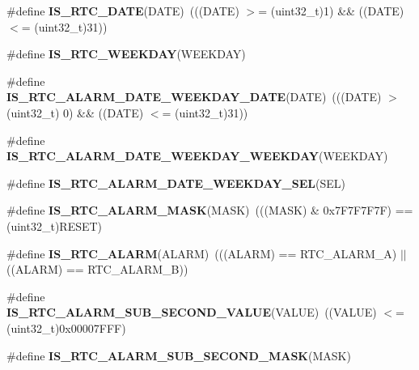 \begin{DoxyCompactItemize}
\item 
\#define {\bfseries I\+S\+\_\+\+R\+T\+C\+\_\+\+D\+A\+TE}(D\+A\+TE)~(((D\+A\+TE) $>$= (uint32\+\_\+t)1) \&\& ((D\+A\+TE) $<$= (uint32\+\_\+t)31))\hypertarget{group___r_t_c___i_s___r_t_c___definitions_ga3b6e966e144cb0495563ef0283d16510}{}\label{group___r_t_c___i_s___r_t_c___definitions_ga3b6e966e144cb0495563ef0283d16510}

\item 
\#define {\bfseries I\+S\+\_\+\+R\+T\+C\+\_\+\+W\+E\+E\+K\+D\+AY}(W\+E\+E\+K\+D\+AY)
\item 
\#define {\bfseries I\+S\+\_\+\+R\+T\+C\+\_\+\+A\+L\+A\+R\+M\+\_\+\+D\+A\+T\+E\+\_\+\+W\+E\+E\+K\+D\+A\+Y\+\_\+\+D\+A\+TE}(D\+A\+TE)~(((D\+A\+TE) $>$(uint32\+\_\+t) 0) \&\& ((D\+A\+TE) $<$= (uint32\+\_\+t)31))\hypertarget{group___r_t_c___i_s___r_t_c___definitions_ga8b6cb39fac113de7c5d2b05a93093243}{}\label{group___r_t_c___i_s___r_t_c___definitions_ga8b6cb39fac113de7c5d2b05a93093243}

\item 
\#define {\bfseries I\+S\+\_\+\+R\+T\+C\+\_\+\+A\+L\+A\+R\+M\+\_\+\+D\+A\+T\+E\+\_\+\+W\+E\+E\+K\+D\+A\+Y\+\_\+\+W\+E\+E\+K\+D\+AY}(W\+E\+E\+K\+D\+AY)
\item 
\#define {\bfseries I\+S\+\_\+\+R\+T\+C\+\_\+\+A\+L\+A\+R\+M\+\_\+\+D\+A\+T\+E\+\_\+\+W\+E\+E\+K\+D\+A\+Y\+\_\+\+S\+EL}(S\+EL)
\item 
\#define {\bfseries I\+S\+\_\+\+R\+T\+C\+\_\+\+A\+L\+A\+R\+M\+\_\+\+M\+A\+SK}(M\+A\+SK)~(((M\+A\+SK) \& 0x7\+F7\+F7\+F7\+F) == (uint32\+\_\+t)\+R\+E\+S\+E\+T)\hypertarget{group___r_t_c___i_s___r_t_c___definitions_ga166108e7bf226d4ea345822eb81ea358}{}\label{group___r_t_c___i_s___r_t_c___definitions_ga166108e7bf226d4ea345822eb81ea358}

\item 
\#define {\bfseries I\+S\+\_\+\+R\+T\+C\+\_\+\+A\+L\+A\+RM}(A\+L\+A\+RM)~(((A\+L\+A\+RM) == R\+T\+C\+\_\+\+A\+L\+A\+R\+M\+\_\+A) $\vert$$\vert$ ((A\+L\+A\+RM) == R\+T\+C\+\_\+\+A\+L\+A\+R\+M\+\_\+B))\hypertarget{group___r_t_c___i_s___r_t_c___definitions_gab101ad18b0bcde557eb8caac469d7725}{}\label{group___r_t_c___i_s___r_t_c___definitions_gab101ad18b0bcde557eb8caac469d7725}

\item 
\#define {\bfseries I\+S\+\_\+\+R\+T\+C\+\_\+\+A\+L\+A\+R\+M\+\_\+\+S\+U\+B\+\_\+\+S\+E\+C\+O\+N\+D\+\_\+\+V\+A\+L\+UE}(V\+A\+L\+UE)~((V\+A\+L\+UE) $<$= (uint32\+\_\+t)0x00007\+F\+F\+F)\hypertarget{group___r_t_c___i_s___r_t_c___definitions_gae7cd07c18cdb2946a2b06f6606ede93c}{}\label{group___r_t_c___i_s___r_t_c___definitions_gae7cd07c18cdb2946a2b06f6606ede93c}

\item 
\#define {\bfseries I\+S\+\_\+\+R\+T\+C\+\_\+\+A\+L\+A\+R\+M\+\_\+\+S\+U\+B\+\_\+\+S\+E\+C\+O\+N\+D\+\_\+\+M\+A\+SK}(M\+A\+SK)
\end{DoxyCompactItemize}


